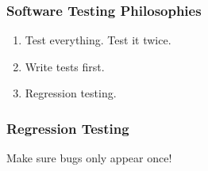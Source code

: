 \begin{frame}[fragile]
\frametitle{Software Testing Philosophies}

\begin{enumerate}
\item Test everything. Test it twice.
\item Write tests first.
\item Regression testing.
\end{enumerate}
\end{frame}

\begin{frame}[fragile]
\frametitle{Regression Testing}

Make sure bugs only appear once!

\end{frame}


